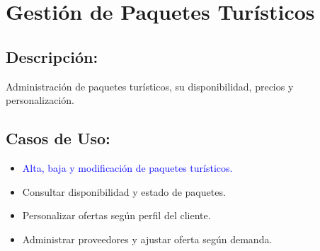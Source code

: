 



\section{Gesti\'on de Paquetes Tur\'isticos}

\subsection*{Descripci\'on:}
Administraci\'on de paquetes tur\'isticos, su disponibilidad, precios y personalizaci\'on.

\subsection*{Casos de Uso:}
\begin{itemize}
    \item \textcolor{blue}{Alta, baja y modificaci\'on de paquetes tur\'isticos.}
    \item Consultar disponibilidad y estado de paquetes.
    \item Personalizar ofertas seg\'un perfil del cliente.
    \item Administrar proveedores y ajustar oferta seg\'un demanda.
\end{itemize}

